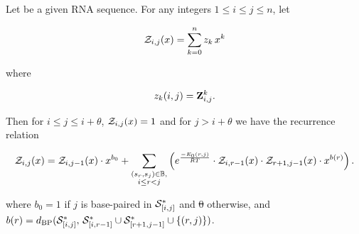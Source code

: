 \documentclass[11pt, oneside]{Thesis} %
\providecommand{\DIFadd}[1]{{\protect\color{blue}\uwave{#1}}} %
\providecommand{\DIFdel}[1]{{\protect\color{red}\sout{#1}}}                      %
\providecommand{\DIFaddbegin}{} %
\providecommand{\DIFaddend}{} %
\providecommand{\DIFdelbegin}{} %
\providecommand{\DIFdelend}{} %
\begin{document}
\begin{theorem}
\label{thm:fftbor:recursions}
Let \seqN be a given RNA sequence.
For any integers $1 \leq i \leq j \leq n$, let

\begin{align}
{\mathcal Z}_{i,j}(x) = \sum_{k=0}^n z_k\,x^k
\end{align}

where

\begin{align}
z_k(i,j) = {\bf Z}^{k}_{i,j}.
\end{align}

Then for $i\leq j \leq i+\theta$, ${\mathcal Z}_{i,j}(x)=1$ and for
$j>i+\theta$ we have the recurrence relation

\begin{align}
\label{eq:fftbor:fftborNussPoly}
\emZ{i,j} = \emZ{i,j-1} \cdot x^{b_0} +
\sum_{\substack{(s_r,s_j) \in \bpSet, \\ i\le r<j}}
\left(
\boltzNuss{r,j} \cdot \emZ{i,r-1} \cdot \emZ{r+1,j-1} \cdot x^{b(r)}
\right).
\end{align}

where $b_0 = 1$ if $j$ is base-paired in $\mathcal S^*_{[i,j]}$ and \DIFdelbegin \DIFdel{0 }\DIFdelend \DIFaddbegin \DIFadd{$0$ }\DIFaddend otherwise, and
$b(r) =
d_{\text{BP}}(\mathcal S^*_{[i,j]},\,\mathcal S^*_{[i,r-1]} \cup \mathcal S^*_{[r+1,j-1]} \cup \{(r,j)\})$.
\end{theorem}
\end{document}
